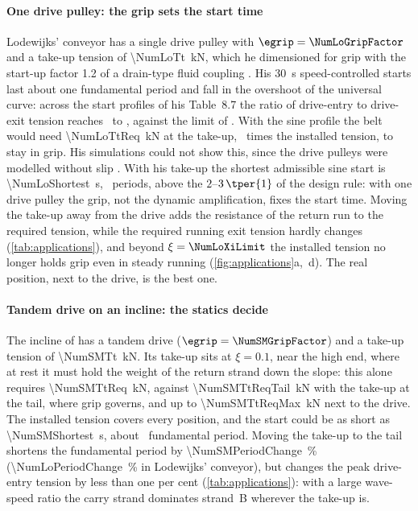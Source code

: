 \paragraph{One drive pulley: the grip sets the start time} Lodewijks' conveyor has a single
drive pulley with $\egrip=\NumLoGripFactor$ and a take-up tension of
\qty{\NumLoTt}{\kilo\newton}, which he dimensioned for grip with the start-up factor 1.2 of a
drain-type fluid coupling \citep[Table~8.2 and Eqs.~8.7--8.9]{lodewijks1996}. His
\qty{30}{\second} speed-controlled starts last about one fundamental period and fall in the
overshoot of the universal curve: across the start profiles of his Table~8.7 the ratio of
drive-entry to drive-exit tension reaches \NumLoGripRatioMin\ to \NumLoGripRatioMax, against
the limit of \NumLoGripFactor. With the sine profile the belt would need
\qty{\NumLoTtReq}{\kilo\newton} at the take-up, \NumLoSineTtFactor\ times the installed
tension, to stay in grip. His simulations could not show this, since the drive pulleys were
modelled without slip \citep[p.~137]{lodewijks1996}. With his take-up the shortest admissible
sine start is \qty{\NumLoShortest}{\second}, \NumLoShortestOverPeriod\ periods, above the
$2$--$3\,\tper{1}$ of the design rule: with one drive pulley the grip, not the dynamic
amplification, fixes the start time. Moving the take-up away from the drive adds the
resistance of the return run to the required tension, while the required running exit
tension hardly changes (\cref{tab:applications}), and beyond $\xi=\NumLoXiLimit$ the installed
tension no longer holds grip even in steady running (\cref{fig:applications}a,~d). The real
position, next to the drive, is the best one.

\paragraph{Tandem drive on an incline: the statics decide} The incline of
\citet{suchorab2025longdistance} has a tandem drive ($\egrip=\NumSMGripFactor$) and a take-up tension of
\qty{\NumSMTt}{\kilo\newton}. Its take-up sits at $\xi=0.1$, near the high end, where at rest
it must hold the weight of the return strand down the slope: this alone requires
\qty{\NumSMTtReq}{\kilo\newton}, against \qty{\NumSMTtReqTail}{\kilo\newton} with the take-up
at the tail, where grip governs, and up to \qty{\NumSMTtReqMax}{\kilo\newton} next to the
drive. The installed tension covers every position, and the start could be as short as
\qty{\NumSMShortest}{\second}, about \NumSMShortestOverPeriod\ fundamental period. Moving the
take-up to the tail shortens the fundamental period by \qty{\NumSMPeriodChange}{\percent}
(\qty{\NumLoPeriodChange}{\percent} in Lodewijks' conveyor), but changes the peak drive-entry
tension by less than one per cent (\cref{tab:applications}): with a large wave-speed ratio
the carry strand dominates strand~B wherever the take-up is.

